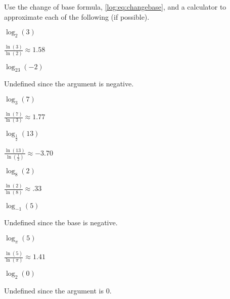 \begin{exercises}
\begin{problem}
Use the change of base formula, \cref{log:eq:changebase}, and a calculator to approximate each 
of the following (if possible).
\begin{multicols}{4}
	\begin{subproblem}
		$\log_2(3)$ 
		\begin{shortsolution}
			$\frac{\ln(3)}{\ln(2)}\approx 1.58$
		\end{shortsolution}
	\end{subproblem}
	\begin{subproblem}
		$\log_{23}(-2)$ 
		\begin{shortsolution}
			Undefined since the argument is negative. 
		\end{shortsolution}
	\end{subproblem}
	\begin{subproblem}
		$\log_3(7)$ 
		\begin{shortsolution}
			$\frac{\ln(7)}{\ln(3)}\approx 1.77$
		\end{shortsolution}
	\end{subproblem}
	\begin{subproblem}
		$\log_{\frac{1}{2}}(13)$ 
		\begin{shortsolution}
			$\frac{\ln(13)}{\ln\left( \frac{1}{2} \right)}\approx -3.70$
		\end{shortsolution}
	\end{subproblem}
	\begin{subproblem}
		$\log_8(2)$ 
		\begin{shortsolution}
			$\frac{\ln(2)}{\ln(8)}\approx .33$
		\end{shortsolution}
	\end{subproblem}
	\begin{subproblem}
		$\log_{-1}(5)$ 
		\begin{shortsolution}
			Undefined since the base is negative.
		\end{shortsolution}
	\end{subproblem}
	\begin{subproblem}
		$\log_\pi(5)$ 
		\begin{shortsolution}
			$\frac{\ln(5)}{\ln(\pi)}\approx 1.41$
		\end{shortsolution}
	\end{subproblem}
	\begin{subproblem}
		$\log_2(0)$ 
		\begin{shortsolution}
			Undefined since the argument is $0$.
		\end{shortsolution}
	\end{subproblem}
\end{multicols}
\end{problem}


\end{exercises}
